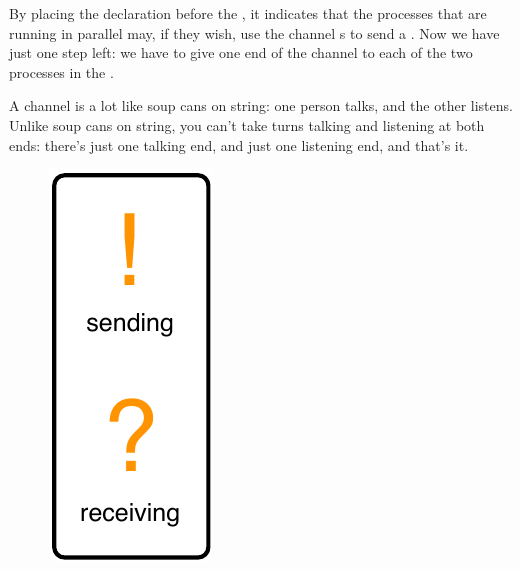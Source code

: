 By placing the declaration before the \PAR, it indicates that the processes that are running in parallel may, if they wish, use the channel {\code s} to send a \SIGNALV. Now we have just one step left: we have to give one end of the channel to each of the two processes in the \PAR.

\newpage

A channel is a lot like soup cans on string: one person talks, and the other listens. Unlike soup cans on string, you can't take turns talking and listening at both ends: there's just one talking end, and just one listening end, and that's it.

\begin{figure}
	  \begin{center}
    	\includegraphics[width=0.8\linewidth]{images/ch4-sending-receiving}

\end{center}
\end{figure}
